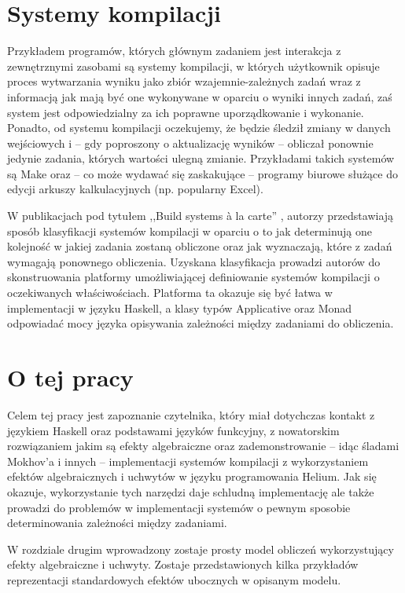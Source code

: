 \section{Systemy kompilacji}

Przykładem programów, których głównym zadaniem jest interakcja z zewnętrznymi zasobami są systemy kompilacji, w których użytkownik opisuje proces wytwarzania wyniku jako zbiór wzajemnie-zależnych zadań wraz z informacją jak mają być one wykonywane w oparciu o wyniki innych zadań, zaś system jest odpowiedzialny za ich poprawne uporządkowanie i wykonanie. Ponadto, od systemu kompilacji oczekujemy, że będzie śledził zmiany w danych wejściowych i -- gdy poproszony o aktualizację wyników -- obliczał ponownie jedynie zadania, których wartości ulegną zmianie. Przykładami takich systemów są Make oraz -- co może wydawać się zaskakujące -- programy biurowe służące do edycji arkuszy kalkulacyjnych (np. popularny Excel).

W publikacjach pod tytułem ,,Build systems {\`a} la carte'' \cite{mokhov2018build, mokhov2020build}, autorzy przedstawiają sposób klasyfikacji systemów kompilacji w oparciu o to jak determinują one kolejność w jakiej zadania zostaną obliczone oraz jak wyznaczają, które z zadań wymagają ponownego obliczenia. Uzyskana klasyfikacja prowadzi autorów do skonstruowania platformy umożliwiającej definiowanie systemów kompilacji o oczekiwanych właściwościach. Platforma ta okazuje się być łatwa w implementacji w języku Haskell, a klasy typów Applicative oraz Monad odpowiadać mocy języka opisywania zależności między zadaniami do obliczenia.

\section{O tej pracy}

Celem tej pracy jest zapoznanie czytelnika, który miał dotychczas kontakt z językiem Haskell oraz podstawami języków funkcyjny, z nowatorskim rozwiązaniem jakim są efekty algebraiczne oraz zademonstrowanie -- idąc śladami Mokhov'a i innych \cite{mokhov2018build, mokhov2020build} -- implementacji systemów kompilacji z wykorzystaniem efektów algebraicznych i uchwytów w języku programowania Helium. Jak się okazuje, wykorzystanie tych narzędzi daje schludną implementację ale także prowadzi do problemów w implementacji systemów o pewnym sposobie determinowania zależności między zadaniami.

W rozdziale drugim wprowadzony zostaje prosty model obliczeń wykorzystujący efekty algebraiczne i uchwyty. Zostaje przedstawionych kilka przykładów reprezentacji standardowych efektów ubocznych w opisanym modelu.

